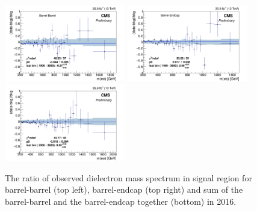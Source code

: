 \begin{figure}[!htbp]
  \begin{center}
    \includegraphics[width=0.47\textwidth]{figures/Zprime/2016/mass/SignalRegionHistEBEB_ratio}
    \includegraphics[width=0.47\textwidth]{figures/Zprime/2016/mass/SignalRegionHistEBEE_ratio}
    \includegraphics[width=0.47\textwidth]{figures/Zprime/2016/mass/SignalRegionHist_ratio}
    \caption{The ratio of observed dielectron mass spectrum in signal region for barrel-barrel (top left), barrel-endcap (top right) and sum of the barrel-barrel and the barrel-endcap together (bottom) in 2016.}
    \label{massratio_2016}
  \end{center}
\end{figure}

